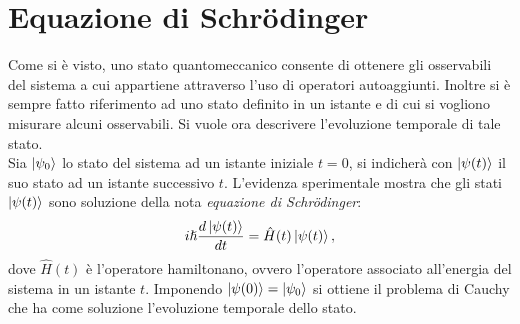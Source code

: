 \section{Equazione di Schrödinger}
Come si è visto, uno stato quantomeccanico consente di ottenere gli osservabili del sistema a cui appartiene attraverso l'uso di operatori autoaggiunti. Inoltre si è sempre fatto riferimento ad uno stato definito in un istante e di cui si vogliono misurare alcuni osservabili. Si vuole ora descrivere l'evoluzione temporale di tale stato.\\

Sia $\ket{\psi_0}$ lo stato del sistema ad un istante iniziale $t=0$, si indicherà con $\ket{\psi(t)}$ il suo stato ad un istante successivo $t$. L'evidenza sperimentale mostra che gli stati $\ket{\psi(t)}$ sono soluzione della nota \emph{equazione di Schrödinger}:
\begin{equation}
    i\hslash\frac{d\ket{\psi(t)}}{dt}=\hat H(t)\ket{\psi(t)},\label{eqSchr}
\end{equation}
dove $\hat H(t)$ è l'operatore hamiltonano, ovvero l'operatore associato all'energia del sistema in un istante $t$. Imponendo $\ket{\psi(0)}=\ket{\psi_0}$ si ottiene il problema di Cauchy che ha come soluzione l'evoluzione temporale dello stato.
